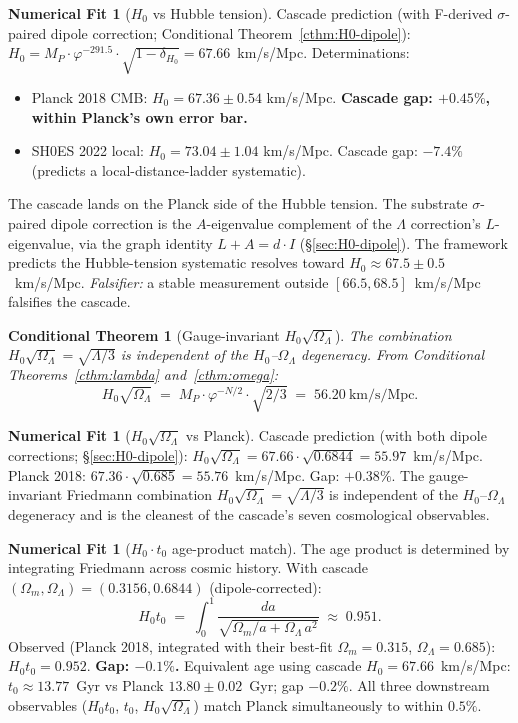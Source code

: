 \documentclass[11pt]{article}
\theoremstyle{plain}
\newtheorem{conditional}[theorem]{Conditional Theorem}
\theoremstyle{definition}
\newtheorem{numfit}[theorem]{Numerical Fit}
\theoremstyle{remark}
\begin{document}
\begin{numfit}[$H_0$ vs Hubble tension]\label{nf:H0}
Cascade prediction (with F-derived $\sigma$-paired dipole correction; Conditional Theorem~\ref{cthm:H0-dipole}): $H_0 = M_P \cdot \varphi^{-291.5} \cdot \sqrt{1 - \delta_{H_0}} = 67.66$~km/s/Mpc. Determinations:
\begin{itemize}[leftmargin=2em]
\item Planck 2018 CMB: $H_0 = 67.36 \pm 0.54$ km/s/Mpc. \textbf{Cascade gap: $+0.45\%$, within Planck's own error bar.}
\item SH0ES 2022 local: $H_0 = 73.04 \pm 1.04$ km/s/Mpc. Cascade gap: $-7.4\%$ (predicts a local-distance-ladder systematic).
\end{itemize}
The cascade lands on the Planck side of the Hubble tension. The substrate $\sigma$-paired dipole correction is the $A$-eigenvalue complement of the $\Lambda$ correction's $L$-eigenvalue, via the graph identity $L + A = d \cdot I$ (\S\ref{sec:H0-dipole}). The framework predicts the Hubble-tension systematic resolves toward $H_0 \approx 67.5 \pm 0.5$~km/s/Mpc. \emph{Falsifier:} a stable measurement outside $[66.5, 68.5]$~km/s/Mpc falsifies the cascade.
\end{numfit}

\begin{conditional}[Gauge-invariant $H_0 \sqrt{\Omega_\Lambda}$]\label{cthm:H0sqrtOmega}
The combination $H_0 \sqrt{\Omega_\Lambda} = \sqrt{\Lambda / 3}$ is independent of the $H_0$--$\Omega_\Lambda$ degeneracy. From Conditional Theorems~\ref{cthm:lambda} and~\ref{cthm:omega}:
\[
  H_0 \sqrt{\Omega_\Lambda} \;=\; M_P \cdot \varphi^{-N/2} \cdot \sqrt{2/3} \;=\; 56.20~\text{km/s/Mpc.}
\]
\end{conditional}

\begin{numfit}[$H_0 \sqrt{\Omega_\Lambda}$ vs Planck]\label{nf:H0sqrtOmega}
Cascade prediction (with both dipole corrections; \S\ref{sec:H0-dipole}): $H_0 \sqrt{\Omega_\Lambda} = 67.66 \cdot \sqrt{0.6844} = 55.97$~km/s/Mpc. Planck 2018: $67.36 \cdot \sqrt{0.685} = 55.76$~km/s/Mpc. Gap: $\mathbf{+0.38\%}$. The gauge-invariant Friedmann combination $H_0 \sqrt{\Omega_\Lambda} = \sqrt{\Lambda/3}$ is independent of the $H_0$--$\Omega_\Lambda$ degeneracy and is the cleanest of the cascade's seven cosmological observables.
\end{numfit}

\begin{numfit}[$H_0 \cdot t_0$ age-product match]\label{nf:H0t0}
The age product is determined by integrating Friedmann across cosmic history. With cascade $(\Omega_m, \Omega_\Lambda) = (0.3156, 0.6844)$ (dipole-corrected):
\[
  H_0 t_0 \;=\; \int_0^1 \frac{da}{\sqrt{\Omega_m/a + \Omega_\Lambda \, a^2}} \;\approx\; 0.951.
\]
Observed (Planck 2018, integrated with their best-fit $\Omega_m = 0.315$, $\Omega_\Lambda = 0.685$): $H_0 t_0 = 0.952$. \textbf{Gap: $-0.1\%$.} Equivalent age using cascade $H_0 = 67.66$~km/s/Mpc: $t_0 \approx 13.77$~Gyr vs Planck $13.80 \pm 0.02$~Gyr; gap $-0.2\%$. All three downstream observables ($H_0 t_0$, $t_0$, $H_0\sqrt{\Omega_\Lambda}$) match Planck simultaneously to within $0.5\%$.
\end{numfit}
\end{document}
